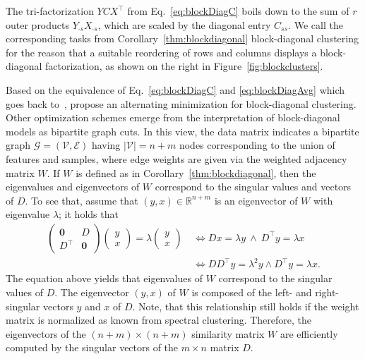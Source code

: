 The tri-factorization $YCX^\top$ from Eq.~\@\eqref{eq:blockDiagC} boils down to the sum of $r$ outer products $Y_{\cdot s}X_{\cdot s}$, which are scaled by the diagonal entry $C_{ss}$. We call the corresponding tasks from Corollary~\ref{thm:blockdiagonal} block-diagonal clustering for the reason that a suitable reordering of rows and columns displays a block-diagonal factorization, as shown on the right in Figure~\ref{fig:blockclusters}.

Based on the equivalence of Eq.~\eqref{eq:blockDiagC} and \eqref{eq:blockDiagAvg} which goes back to~\cite{mirkin1995additive}, \cite{han2017bilateral} propose an alternating minimization for block-diagonal clustering.
Other optimization schemes emerge from the interpretation of 
block-diagonal models as bipartite graph cuts. In this view, the data matrix indicates a bipartite graph $\mathcal{G}=(\mathcal{V},\mathcal{E})$ having $\lvert \mathcal{V}\rvert =n+m$ nodes corresponding to the union of features and samples, where edge weights are given via the weighted adjacency matrix $W$.
If $W$ is defined as in Corollary~\ref{thm:blockdiagonal}, then the eigenvalues and eigenvectors of $W$ correspond to the singular values and vectors of $D$. To see that, assume that $(y,x)\in\mathbb{R}^{n+m}$ is an eigenvector of $W$ with eigenvalue $\lambda$; it holds that
\begin{align*}
\begin{pmatrix}
\mathbf{0} & D\\
D^\top & \mathbf{0}
\end{pmatrix}
\begin{pmatrix}
y\\x
\end{pmatrix}
= \lambda \begin{pmatrix}
y\\ x
\end{pmatrix}\ 
&\Leftrightarrow Dx=\lambda y \ \wedge \ D^\top y=\lambda x\\
&\Leftrightarrow DD^\top y = \lambda^2 y \wedge D^\top y=\lambda x.
\end{align*}
The equation above yields that eigenvalues of $W$ correspond to the singular values of $D$. The eigenvector $(y,x)$ of $W$ is composed of the left- and right-singular vectors $y$ and $x$ of $D$. Note, that this relationship still holds if the weight matrix is normalized as known from spectral clustering. Therefore, the eigenvectors of the $(n+m)\times (n+m)$ similarity matrix $W$ are efficiently computed by the singular vectors of the $m\times n$ matrix $D$. 

